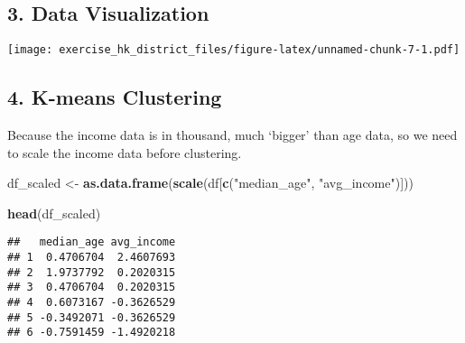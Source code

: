 \documentclass[]{article}
\newenvironment{Shaded}{\begin{snugshade}}{\end{snugshade}}
\newcommand{\CommentTok}[1]{\textcolor[rgb]{0.56,0.35,0.01}{\textit{#1}}}
\newcommand{\DataTypeTok}[1]{\textcolor[rgb]{0.13,0.29,0.53}{#1}}
\newcommand{\DecValTok}[1]{\textcolor[rgb]{0.00,0.00,0.81}{#1}}
\newcommand{\KeywordTok}[1]{\textcolor[rgb]{0.13,0.29,0.53}{\textbf{#1}}}
\newcommand{\NormalTok}[1]{#1}
\newcommand{\OperatorTok}[1]{\textcolor[rgb]{0.81,0.36,0.00}{\textbf{#1}}}
\newcommand{\StringTok}[1]{\textcolor[rgb]{0.31,0.60,0.02}{#1}}
\begin{document}
\hypertarget{data-visualization}{%
\subsection{3. Data Visualization}\label{data-visualization}}

\begin{Shaded}
\end{Shaded}

\texttt{[image: exercise\_hk\_district\_files/figure-latex/unnamed-chunk-7-1.pdf]}

\hypertarget{k-means-clustering}{%
\subsection{4. K-means Clustering}\label{k-means-clustering}}

Because the income data is in thousand, much `bigger' than age data, so
we need to scale the income data before clustering.

\begin{Shaded}
\begin{Highlighting}[]
\NormalTok{df_scaled <-}\StringTok{ }\KeywordTok{as.data.frame}\NormalTok{(}\KeywordTok{scale}\NormalTok{(df[}\KeywordTok{c}\NormalTok{(}\StringTok{"median_age"}\NormalTok{, }\StringTok{"avg_income"}\NormalTok{)]))}

\KeywordTok{head}\NormalTok{(df_scaled)}
\end{Highlighting}
\end{Shaded}

\begin{verbatim}
##   median_age avg_income
## 1  0.4706704  2.4607693
## 2  1.9737792  0.2020315
## 3  0.4706704  0.2020315
## 4  0.6073167 -0.3626529
## 5 -0.3492071 -0.3626529
## 6 -0.7591459 -1.4920218
\end{verbatim}

\begin{Shaded}
\end{Shaded}
\end{document}
